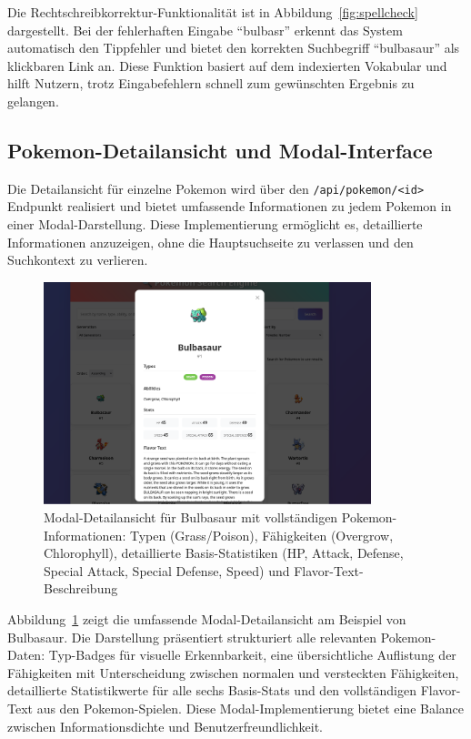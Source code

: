 Die Rechtschreibkorrektur-Funktionalität ist in Abbildung~\ref{fig:spellcheck} dargestellt. Bei der fehlerhaften Eingabe "`bulbasr"' erkennt das System automatisch den Tippfehler und bietet den korrekten Suchbegriff "`bulbasaur"' als klickbaren Link an. Diese Funktion basiert auf dem indexierten Vokabular und hilft Nutzern, trotz Eingabefehlern schnell zum gewünschten Ergebnis zu gelangen.

\subsection{Pokemon-Detailansicht und Modal-Interface}

Die Detailansicht für einzelne Pokemon wird über den \texttt{/api/pokemon/<id>} Endpunkt realisiert und bietet umfassende Informationen zu jedem Pokemon in einer Modal-Darstellung. Diese Implementierung ermöglicht es, detaillierte Informationen anzuzeigen, ohne die Hauptsuchseite zu verlassen und den Suchkontext zu verlieren.

\begin{figure}[htbp]
    \centering
    \includegraphics[width=0.85\textwidth]{figures/Screenshot_modal.png}
    \caption{Modal-Detailansicht für Bulbasaur mit vollständigen Pokemon-Informationen: Typen (Grass/Poison), Fähigkeiten (Overgrow, Chlorophyll), detaillierte Basis-Statistiken (HP, Attack, Defense, Special Attack, Special Defense, Speed) und Flavor-Text-Beschreibung}
    \label{fig:pokemon_modal}
\end{figure}

Abbildung~\ref{fig:pokemon_modal} zeigt die umfassende Modal-Detailansicht am Beispiel von Bulbasaur. Die Darstellung präsentiert strukturiert alle relevanten Pokemon-Daten: Typ-Badges für visuelle Erkennbarkeit, eine übersichtliche Auflistung der Fähigkeiten mit Unterscheidung zwischen normalen und versteckten Fähigkeiten, detaillierte Statistikwerte für alle sechs Basis-Stats und den vollständigen Flavor-Text aus den Pokemon-Spielen. Diese Modal-Implementierung bietet eine Balance zwischen Informationsdichte und Benutzerfreundlichkeit.

